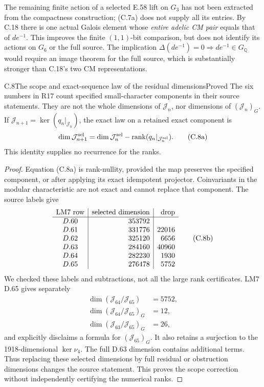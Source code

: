 The remaining finite action of a selected E.58 lift on
\(G_3\) has not been extracted from the compactness
construction; (C.7a) does not supply all its entries.
By C.18 there is one actual Galois element whose
\emph{entire adelic CM pair} equals that of \(de^{-1}\).
This improves the finite \((1,1)\)-bit comparison, but
does not identify its actions on \(G_6\) or the full
source. The implication
\(\Delta(de^{-1})=0\Rightarrow de^{-1}\in G_{\mathbb Q}\)
would require an image theorem for the full source,
which is substantially stronger than C.18's two CM
representations.

\begin{statement}{C.8}{The scope and exact-sequence law of the residual dimensions}{Proved}
The six numbers in R17 count specified small-character
components in their source statements. They are not the
whole dimensions of \(\mathcal J_n\), nor dimensions of
\((\mathcal J_n)_G\).
If \(\mathcal J_{n+1}=\ker(q_n|_{\mathcal J_n})\),
the exact law on a retained exact component is
\[
 \dim\mathcal J_{n+1}^{\rm sel}
  =\dim\mathcal J_n^{\rm sel}
    -\operatorname{rank}(q_n|_{\mathcal J_n^{\rm sel}}).
 \tag{C.8a}
\]
This identity supplies no recurrence for the ranks.
\end{statement}
\begin{proof}
Equation (C.8a) is rank-nullity, provided the map
preserves the specified component, or after applying
its exact idempotent projector.
Coinvariants in the modular characteristic are not
exact and cannot replace that component.
The source labels give
\[
\begin{array}{c|r|r}
 \hbox{LM7 row}&\hbox{selected dimension}
                    &\hbox{drop}\\ \hline
 D.60&353792&\\
 D.61&331776&22016\\
 D.62&325120&6656\\
 D.63&284160&40960\\
 D.64&282230&1930\\
 D.65&276478&5752
\end{array}
\tag{C.8b}
\]
We checked these labels and subtractions, not all
the large rank certificates. LM7 D.65 gives separately
\[
 \begin{aligned}
 \dim(\mathcal J_{64}/\mathcal J_{65})&=5752,\\
 \dim(\mathcal J_{64}/\mathcal J_{65})_G&=12,\\
 \dim(\mathcal J_{63}/\mathcal J_{65})_G&=26,
 \end{aligned}
 \tag{C.8c}
\]
and explicitly disclaims a formula for
\((\mathcal J_{65})_G\). It also retains a surjection
to the 1918-dimensional \(\ker\nu_4\).
The full D.63 dimension contains additional terms.
Thus replacing these selected dimensions by full
residual or obstruction dimensions changes the
source statement. This proves the scope correction
without independently certifying the numerical ranks.
\end{proof}

